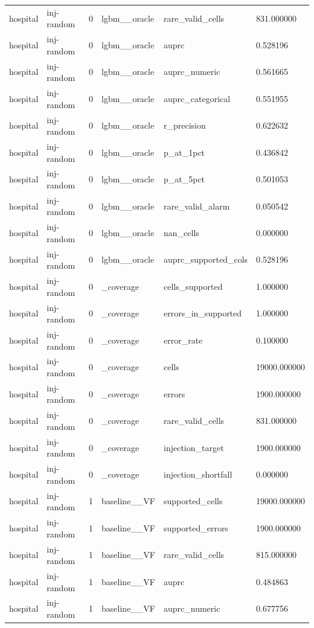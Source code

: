 \begin{tabular}{llllll}
hospital & inj-random & 0 & lgbm\_\_oracle & rare\_valid\_cells & 831.000000 \\
hospital & inj-random & 0 & lgbm\_\_oracle & auprc & 0.528196 \\
hospital & inj-random & 0 & lgbm\_\_oracle & auprc\_numeric & 0.561665 \\
hospital & inj-random & 0 & lgbm\_\_oracle & auprc\_categorical & 0.551955 \\
hospital & inj-random & 0 & lgbm\_\_oracle & r\_precision & 0.622632 \\
hospital & inj-random & 0 & lgbm\_\_oracle & p\_at\_1pct & 0.436842 \\
hospital & inj-random & 0 & lgbm\_\_oracle & p\_at\_5pct & 0.501053 \\
hospital & inj-random & 0 & lgbm\_\_oracle & rare\_valid\_alarm & 0.050542 \\
hospital & inj-random & 0 & lgbm\_\_oracle & nan\_cells & 0.000000 \\
hospital & inj-random & 0 & lgbm\_\_oracle & auprc\_supported\_cols & 0.528196 \\
hospital & inj-random & 0 & \_coverage & cells\_supported & 1.000000 \\
hospital & inj-random & 0 & \_coverage & errors\_in\_supported & 1.000000 \\
hospital & inj-random & 0 & \_coverage & error\_rate & 0.100000 \\
hospital & inj-random & 0 & \_coverage & cells & 19000.000000 \\
hospital & inj-random & 0 & \_coverage & errors & 1900.000000 \\
hospital & inj-random & 0 & \_coverage & rare\_valid\_cells & 831.000000 \\
hospital & inj-random & 0 & \_coverage & injection\_target & 1900.000000 \\
hospital & inj-random & 0 & \_coverage & injection\_shortfall & 0.000000 \\
hospital & inj-random & 1 & baseline\_\_VF & supported\_cells & 19000.000000 \\
hospital & inj-random & 1 & baseline\_\_VF & supported\_errors & 1900.000000 \\
hospital & inj-random & 1 & baseline\_\_VF & rare\_valid\_cells & 815.000000 \\
hospital & inj-random & 1 & baseline\_\_VF & auprc & 0.484863 \\
hospital & inj-random & 1 & baseline\_\_VF & auprc\_numeric & 0.677756 \\

\end{tabular}
